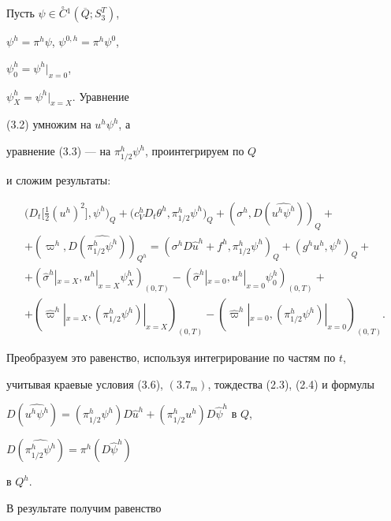 \documentclass[12pt]{article}
\theoremstyle{plain} %
\theoremstyle{definition}
\numberwithin{equation}{section}
\begin{document}
\begin{pf} Пусть $\psi\in \overset{\circ}{C}{}^1(\overline Q;S_3^T)$,


$\psi^h = \pi^h\psi$, $\psi^{0,h}=\pi^h\psi^0$,


$\psi^h_0 = \psi^h|_{x=0}$,


$\psi^h_X = \psi^h|_{x=X}$. Уравнение


(3.2) умножим на $u^h\psi^h$, а


уравнение (3.3) --- на $\pi^h_{1/2}\psi^h$, проинтегрируем по $Q$


и сложим результаты:


\begin{gather*}


\bigl(D_t\bigl[\frac{1}{2}(u^h)^2\bigr],\psi^h\bigr)_Q +


\bigl(c_V^hD_t\theta^h, \pi^h_{1/2}\psi^h\bigr)_Q +


(\sigma^h,D(\widehat{u^h\psi^h}))_Q +\\


%


+(\varpi^h,D(\widehat{\pi^h_{1/2}\psi^h}))_{Q^h}


=(\sigma^h D\widehat u^h + f^h, \pi^h_{1/2}\psi^h)_Q +


(g^h u^h, \psi^h)_Q+\\


%


+(\widehat\sigma^h|_{x=X}, u^h|_{x=X}\psi^h_X)_{(0,T)} -


(\widehat\sigma^h|_{x=0}, u^h|_{x=0}\psi^h_0)_{(0,T)}+\\


%


+(\widehat\varpi^h|_{x=X}, (\pi^h_{1/2}\psi^h)|_{x=X})_{(0,T)} -


(\widehat\varpi^h|_{x=0}, (\pi^h_{1/2}\psi^h)|_{x=0})_{(0,T)}.


\end{gather*}


Преобразуем это равенство, используя интегрирование по частям по $t$,


учитывая краевые условия (3.6), $(3.7_m)$, тождества (2.3), (2.4) и формулы


$D(\widehat{u^h\psi^h})=(\pi^h_{1/2}\psi^h)D\widehat u^h +


(\pi^h_{1/2}u^h)D\widehat\psi^h$ в $Q$,


$D(\widehat{\pi^h_{1/2}\psi^h})=\pi^h(D\widehat\psi^h)$


в $Q^h$.


В результате получим равенство



\end{pf}
\end{document}
